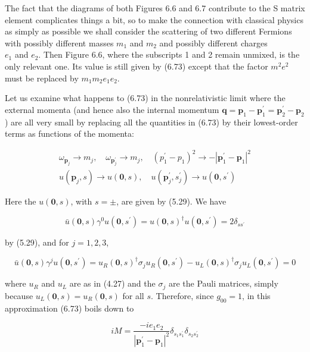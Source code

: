 \documentclass[10pt, letterpaper]{article}
\begin{document}
The fact that the diagrams of both Figures 6.6 and 6.7 contribute to the S matrix element complicates things a bit, so to make the connection with classical physics as simply as possible we shall consider the scattering of two different Fermions with possibly different masses $m_{1}$ and $m_{2}$ and possibly different charges\\
$e_{1}$ and $e_{2}$. Then Figure 6.6, where the subscripts 1 and 2 remain unmixed, is the only relevant one. Its value is still given by (6.73) except that the factor $m^{2} e^{2}$ must be replaced by $m_{1} m_{2} e_{1} e_{2}$.

Let us examine what happens to (6.73) in the nonrelativistic limit where the external momenta (and hence also the internal momentum $\mathbf{q}=\mathbf{p}_{1}-\mathbf{p}_{1}^{\prime}=\mathbf{p}_{2}^{\prime}-\mathbf{p}_{2}$ ) are all very small by replacing all the quantities in (6.73) by their lowest-order terms as functions of the momenta:

$$
\begin{aligned}
\omega_{\mathbf{p}_{j}} \rightarrow m_{j}, \quad \omega_{\mathbf{p}_{j}^{\prime}} \rightarrow m_{j}, \quad\left(p_{1}^{\prime}-p_{1}\right)^{2} \rightarrow-\left|\mathbf{p}_{1}^{\prime}-\mathbf{p}_{1}\right|^{2} \\
u\left(\mathbf{p}_{j}, s\right) \rightarrow u(\mathbf{0}, s), \quad u\left(\mathbf{p}_{j}^{\prime}, s_{j}^{\prime}\right) \rightarrow u\left(\mathbf{0}, s^{\prime}\right)
\end{aligned}
$$

Here the $u(\mathbf{0}, s)$, with $s= \pm$, are given by (5.29). We have

$$
\bar{u}(\mathbf{0}, s) \gamma^{0} u\left(\mathbf{0}, s^{\prime}\right)=u(\mathbf{0}, s)^{\dagger} u\left(\mathbf{0}, s^{\prime}\right)=2 \delta_{s s^{\prime}}
$$

by (5.29), and for $j=1,2,3$,

$$
\bar{u}(\mathbf{0}, s) \gamma^{j} u\left(\mathbf{0}, s^{\prime}\right)=u_{R}(\mathbf{0}, s)^{\dagger} \sigma_{j} u_{R}\left(\mathbf{0}, s^{\prime}\right)-u_{L}(\mathbf{0}, s)^{\dagger} \sigma_{j} u_{L}\left(\mathbf{0}, s^{\prime}\right)=0
$$

where $u_{R}$ and $u_{L}$ are as in (4.27) and the $\sigma_{j}$ are the Pauli matrices, simply because $u_{L}(\mathbf{0}, s)=u_{R}(\mathbf{0}, s)$ for all $s$. Therefore, since $g_{00}=1$, in this approximation (6.73) boils down to

$$
i M=\frac{-i e_{1} e_{2}}{\left|\mathbf{p}_{1}^{\prime}-\mathbf{p}_{1}\right|^{2}} \delta_{s_{1} s_{1}^{\prime}} \delta_{s_{2} s_{2}^{\prime}}
$$
\end{document}
